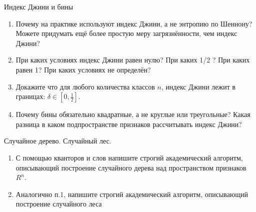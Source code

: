 \documentclass{beamer}
\begin{document}
\begin{frame}{Индекс Джини и бины}
	\begin{enumerate}
		\item Почему на практике используют индекс Джини, а не энтропию по Шеннону? 
		Можете придумать ещё более простую меру загрязнённости, чем индекс Джини?
		\item При каких условиях индекс Джини равен нулю? При каких 1/2 ? 
		При каких равен 1? При каких условиях не определён?
		\item Докажите что для любого количества классов $n$, индекс Джини лежит в границах: $\delta \in [0, \frac{1}{2}]$.
		\item Почему бины обязательно квадратные, а не круглые или треугольные? Какая разница
		в каком подпространстве признаков рассчитывать индекс Джини? 	
	\end{enumerate}
\end{frame}



\begin{frame}{Случайное дерево. Случайный лес.}
	\begin{enumerate}
	\item С помощью кванторов и слов 
	напишите строгий академический алгоритм,
	описывающий построение случайного дерева 
	над пространством признаков $R^n$.
	\item Аналогично п.1, напишите 
	строгий академический алгоритм,
	описывающий построение случайного леса
	\end{enumerate} 
\end{frame} 
  
\end{document}
